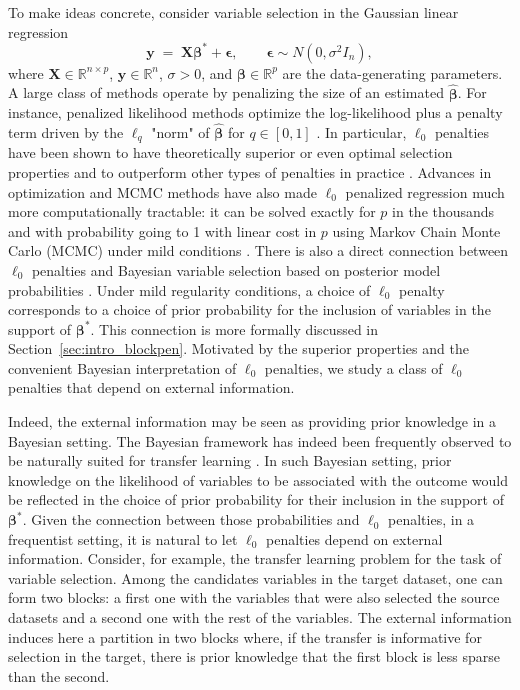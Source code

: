 \documentclass[
  12pt]{article}
\newcommand{\R}{\mathbb{R}}
\newcommand{\by}{\mathbf{y}}
\newcommand{\bbeta}{\boldsymbol{\beta}}
\newcommand{\bepsilon}{\mathbf{\epsilon}}
\newcommand{\bX}{\mathbf{X}}
\begin{document}
To make ideas concrete, consider variable selection in the Gaussian linear regression
\begin{equation}\label{eq:linearmodel}
	\by \;=\; \bX \bbeta^* + \bepsilon,\qquad \bepsilon \sim N(0,\sigma^2 I_n),
\end{equation}
where $\bX\in \R^{n\times p}$, $\by\in \R^n$, $\sigma >0$, and $\bbeta \in \mathbb{R}^p$ are the data-generating parameters. A large class of methods operate by penalizing the size of an estimated $\hat{\bbeta}$. For instance, penalized likelihood methods optimize the log-likelihood plus a penalty term driven by the $\ell_q$ "norm" of $\hat{\bbeta}$ for $q\in [0,1]$ \citep{lasso,bertsimas}. In particular, $\ell_0$ penalties have been shown to have theoretically superior or even optimal selection properties \cite{infotheowainwright, XXXbyon} and to outperform other types of penalties in practice \cite{mazumder2020}. Advances in optimization and MCMC methods have also made $\ell_0$ penalized regression much more computationally tractable: it can be solved exactly for $p$ in the thousands \citep{bertsimas2020sparse} and with probability going to 1 with linear cost in $p$ using Markov Chain Monte Carlo (MCMC) under mild conditions \citep{Yang2016,zhou2022}. There is also a direct connection between $\ell_0$ penalties and Bayesian variable selection based on posterior model probabilities \citep{BIC,EBIC,rossell2022concentration}. Under mild regularity conditions, a choice of $\ell_0$ penalty corresponds to a choice of prior probability for the inclusion of variables in the support of $\bbeta^*$. This connection is more formally discussed in Section~\ref{sec:intro_blockpen}. Motivated by the superior properties and the convenient Bayesian interpretation of $\ell_0$ penalties, we study a class of $\ell_0$ penalties that depend on external information.

Indeed, the external information may be seen as providing prior knowledge in a Bayesian setting. The Bayesian framework has indeed been frequently observed to be naturally suited for transfer learning \cite{telesca, dunson...}. In such Bayesian setting, prior knowledge on the likelihood of variables to be associated with the outcome would be reflected in the choice of prior probability for their inclusion in the support of $\bbeta^*$. Given the connection between those probabilities and $\ell_0$ penalties, in a frequentist setting, it is natural to let $\ell_0$ penalties depend on external information. Consider, for example, the transfer learning problem for the task of variable selection. Among the candidates variables in the target dataset, one can form two blocks: a first one with the variables that were also selected the source datasets and a second one with the rest of the variables. The external information induces here a partition in two blocks where, if the transfer is informative for selection in the target, there is prior knowledge that the first block is less sparse than the second.
\end{document}
